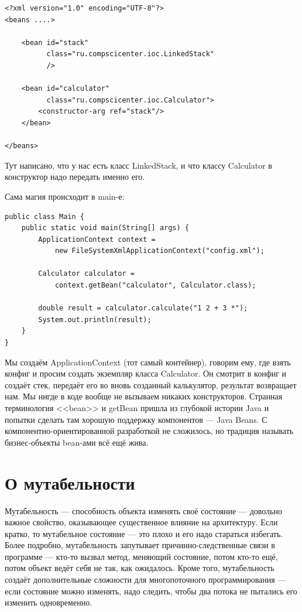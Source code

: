 \documentclass[a5paper]{article}
\begin{document}
\begin{verbatim}
<?xml version="1.0" encoding="UTF-8"?>
<beans ....>

    <bean id="stack"
          class="ru.compscicenter.ioc.LinkedStack"
          />

    <bean id="calculator"
          class="ru.compscicenter.ioc.Calculator">
        <constructor-arg ref="stack"/>
    </bean>

</beans>
\end{verbatim}

Тут написано, что у нас есть класс LinkedStack, и что классу Calculator в конструктор надо передать именно его.

Сама магия происходит в main-е:

\begin{verbatim}
public class Main {
    public static void main(String[] args) {
        ApplicationContext context = 
            new FileSystemXmlApplicationContext("config.xml");

        Calculator calculator = 
            context.getBean("calculator", Calculator.class);

        double result = calculator.calculate("1 2 + 3 *");
        System.out.println(result);
    }
}
\end{verbatim}

Мы создаём ApplicationContext (тот самый контейнер), говорим ему, где взять конфиг и просим создать экземпляр класса Calculator. Он смотрит в конфиг и создаёт стек, передаёт его во вновь созданный калькулятор, результат возвращает нам. Мы нигде в  коде вообще не вызываем никаких конструкторов. Странная терминология <<bean>> и getBean пришла из глубокой истории Java и попытки сделать там хорошую поддержку компонентов --- Java Beans. С компонентно-ориентированной разработкой не сложилось, но традиция называть бизнес-объекты bean-ами всё ещё жива.

\section{О мутабельности}

Мутабельность --- способность объекта изменять своё состояние --- довольно важное свойство, оказывающее существенное влияние на архитектуру. Если кратко, то мутабельное состояние --- это плохо и его надо стараться избегать. Более подробно, мутабельность запутывает причинно-следственные связи в программе --- кто-то вызвал метод, меняющий состояние, потом кто-то ещё, потом объект ведёт себя не так, как ожидалось. Кроме того, мутабельность создаёт дополнительные сложности для многопоточного программирования --- если состояние можно изменять, надо следить, чтобы два потока не пытались его изменить одновременно.
\end{document}

